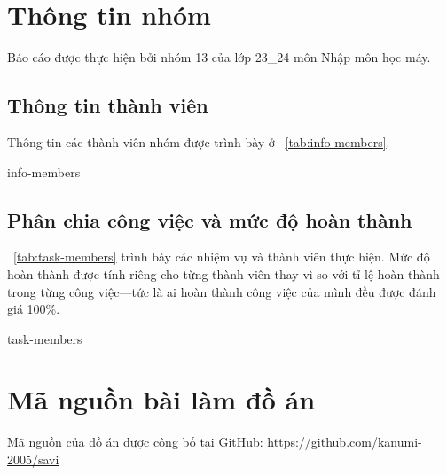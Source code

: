 \section{Thông tin nhóm}

Báo cáo được thực hiện bởi nhóm 13 của lớp 23\_24 môn Nhập môn học máy.

\subsection{Thông tin thành viên}
Thông tin các thành viên nhóm được trình bày ở
\tablename~\ref{tab:info-members}.

{info-members}

\subsection{Phân chia công việc và mức độ hoàn thành}

\tablename~\ref{tab:task-members} trình bày các nhiệm vụ và thành viên thực
hiện. Mức độ hoàn thành được tính riêng cho từng thành viên thay vì so với tỉ
lệ hoàn thành trong từng công việc---tức là ai hoàn thành công việc của mình
đều được đánh giá 100\%.

{task-members}

\section{Mã nguồn bài làm đồ án}
Mã nguồn của đồ án được công bố tại GitHub:
\url{https://github.com/kanumi-2005/savi}
